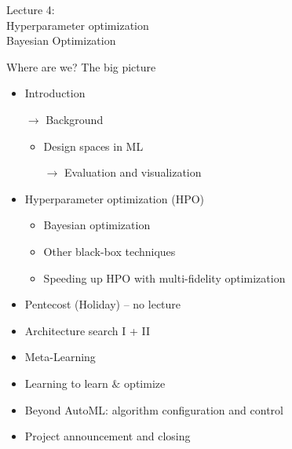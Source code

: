 \begin{frame}[c]{}

\centering
\huge
Lecture 4:\\
Hyperparameter optimization\\
Bayesian Optimization
\end{frame}
\begin{frame}[c]{Where are we? The big picture}

\begin{itemize}
	\item Introduction
	\item[$\to$] Background
	\begin{itemize}
		\item Design spaces in ML
		\item[$\to$] Evaluation and visualization
	\end{itemize}
	\item Hyperparameter optimization (HPO)
	\begin{itemize}
		\item Bayesian optimization
		\item Other black-box techniques
		\item Speeding up HPO with multi-fidelity optimization
	\end{itemize}
	\item Pentecost (Holiday) -- no lecture
	\item Architecture search I + II
	\item Meta-Learning
	\item Learning to learn $\&$ optimize
	\item Beyond AutoML: algorithm configuration and control
	\item Project announcement and closing
\end{itemize}

\end{frame}

